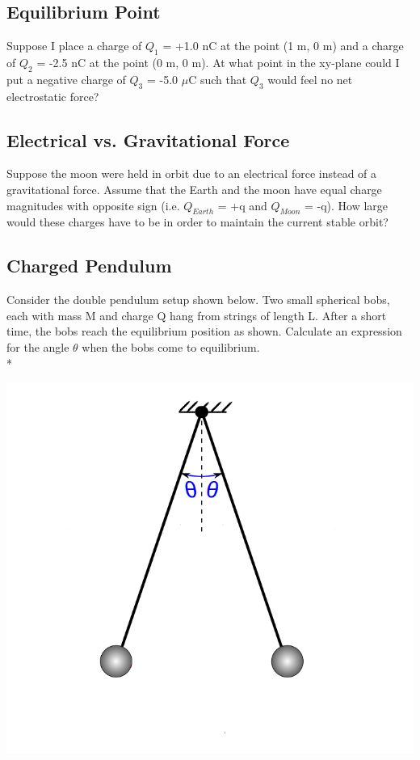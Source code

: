 \documentclass[11pt]{article}
\begin{document}
\subsection{Equilibrium Point}
Suppose I place a charge of $Q_1$ = +1.0 nC at the point (1 m, 0 m) and a charge of $Q_2$ = -2.5 nC at the point (0 m, 0 m).  At what point in the xy-plane could I put a negative charge of $Q_3$ = -5.0 $\mu$C such that $Q_3$ would feel no net electrostatic force?

\subsection{Electrical vs. Gravitational Force}
Suppose the moon were held in orbit due to an electrical force instead of a gravitational force.  Assume that the Earth and the moon have equal charge magnitudes with opposite sign (i.e. $Q_{Earth}$ = +q and $Q_{Moon}$ = -q).  How large would these charges have to be in order to maintain the current stable orbit?

\subsection{Charged Pendulum}
Consider the double pendulum setup shown below.  Two small spherical bobs, each with mass M and charge Q hang from strings of length L.  After a short time, the bobs reach the equilibrium position as shown.  Calculate an expression for the angle $\theta$ when the bobs come to equilibrium.\\*

\begin{center}
\includegraphics[scale=0.25]{Images/pendulum.png}
\end{center}
\end{document}
